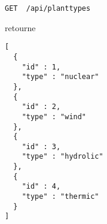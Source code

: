 \begin{lstlisting}
GET  /api/planttypes
\end{lstlisting}

retourne

\begin{lstlisting}
[
  {
    "id" : 1,
    "type" : "nuclear"
  },
  {
    "id" : 2,
    "type" : "wind"
  },
  {
    "id" : 3,
    "type" : "hydrolic"
  },
  {
    "id" : 4,
    "type" : "thermic"
  }
]
\end{lstlisting}



